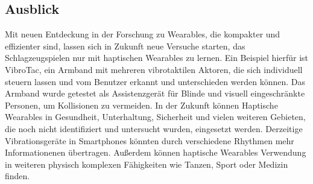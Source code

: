 \documentclass[ngerman,runningheads,a4paper]{llncs}
\begin{document}
\subsection{Ausblick}
Mit neuen Entdeckung in der Forschung zu Wearables, die kompakter und effizienter sind, lassen sich in Zukunft neue Versuche starten, das Schlagzeugspielen nur mit haptischen Wearables zu lernen. Ein Beispiel hierfür ist VibroTac, ein Armband mit mehreren vibrotaktilen Aktoren, die sich individuell steuern lassen und vom Benutzer erkannt und unterschieden werden können. Das Armband wurde getestet als Assistenzgerät für Blinde und visuell eingeschränkte Personen, um Kollisionen zu vermeiden.
In der Zukunft können Haptische Wearables in Gesundheit, Unterhaltung, Sicherheit und vielen weiteren Gebieten, die noch nicht identifiziert und untersucht wurden, eingesetzt werden.
Derzeitige Vibrationsgeräte in Smartphones könnten durch verschiedene Rhythmen mehr Informationenen übertragen.
Außerdem können haptische Wearables Verwendung in weiteren physisch komplexen Fähigkeiten wie Tanzen, Sport oder Medizin finden. %




\end{document}
